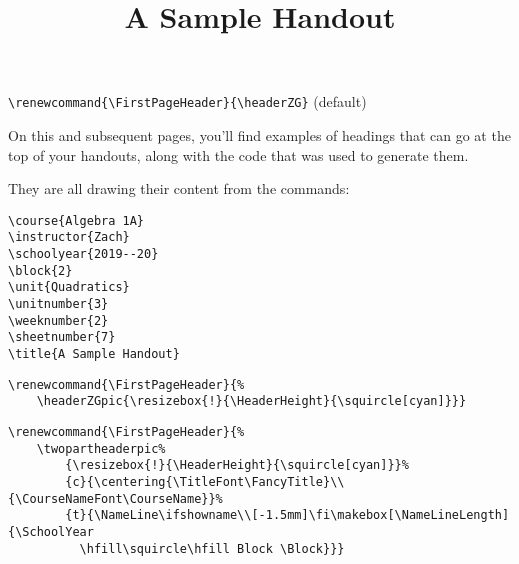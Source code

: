 \documentclass[12pt,twoside,parskip,notitle]{handout}
\title{A Sample Handout}
\begin{document}
\begingroup
\maketitle
\verb|\renewcommand{\FirstPageHeader}{\headerZG}| (default)
\endgroup

\vfill
On this and subsequent pages, you'll find examples of headings that can go at the top of your handouts, along with the code that was used to generate them.

They are all drawing their content from the commands:
\begingroup
\singlespacing
\begin{verbatim}
\course{Algebra 1A}
\instructor{Zach}
\schoolyear{2019--20}
\block{2}
\unit{Quadratics}
\unitnumber{3}
\weeknumber{2}
\sheetnumber{7}
\title{A Sample Handout}
\end{verbatim}
\endgroup
\newpage

\begingroup
\renewcommand{\FirstPageHeader}{\headerZGpic{\resizebox{!}{\HeaderHeight}{\squircle[cyan]}}}
\maketitle
\singlespacing
\begin{verbatim}
\renewcommand{\FirstPageHeader}{%
    \headerZGpic{\resizebox{!}{\HeaderHeight}{\squircle[cyan]}}}
\end{verbatim}
\endgroup

\newpage

\begingroup
\renewcommand{\FirstPageHeader}{%
	\twopartheaderpic%
	{\resizebox{!}{\HeaderHeight}{\squircle[cyan]}}%
	{c}{\centering{\TitleFont\FancyTitle}\\{\CourseNameFont\CourseName}}%
	{t}{\NameLine\ifshowname\\[-1.5mm]\fi\makebox[\NameLineLength]{\SchoolYear\hfill\squircle\hfill Block \Block}}}
\maketitle
\singlespacing
\begin{verbatim}
\renewcommand{\FirstPageHeader}{%
    \twopartheaderpic%
        {\resizebox{!}{\HeaderHeight}{\squircle[cyan]}}%
        {c}{\centering{\TitleFont\FancyTitle}\\{\CourseNameFont\CourseName}}%
        {t}{\NameLine\ifshowname\\[-1.5mm]\fi\makebox[\NameLineLength]{\SchoolYear
          \hfill\squircle\hfill Block \Block}}}
\end{verbatim}
\endgroup
\end{document}
